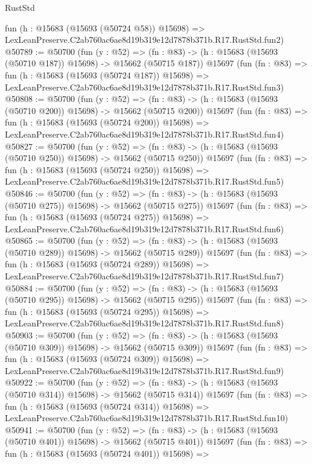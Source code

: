 \begin{lexlean}{RustStd}
\begin{coremodule}
    fun (h : @15683 (@15693 (@50724 @58)) @15698) =>
    LexLeanPreserve.C2ab760ac6ae8d19b319e12d7878b371b.R17.RustStd.fun2)
@50789 := @50700
    (fun (y : @52) =>
    (fn : @83) -> (h : @15683 (@15693 (@50710 @187)) @15698) -> @15662 (@50715 @187))
    @15697
    (fun (fn : @83) =>
    fun (h : @15683 (@15693 (@50724 @187)) @15698) =>
    LexLeanPreserve.C2ab760ac6ae8d19b319e12d7878b371b.R17.RustStd.fun3)
@50808 := @50700
    (fun (y : @52) =>
    (fn : @83) -> (h : @15683 (@15693 (@50710 @200)) @15698) -> @15662 (@50715 @200))
    @15697
    (fun (fn : @83) =>
    fun (h : @15683 (@15693 (@50724 @200)) @15698) =>
    LexLeanPreserve.C2ab760ac6ae8d19b319e12d7878b371b.R17.RustStd.fun4)
@50827 := @50700
    (fun (y : @52) =>
    (fn : @83) -> (h : @15683 (@15693 (@50710 @250)) @15698) -> @15662 (@50715 @250))
    @15697
    (fun (fn : @83) =>
    fun (h : @15683 (@15693 (@50724 @250)) @15698) =>
    LexLeanPreserve.C2ab760ac6ae8d19b319e12d7878b371b.R17.RustStd.fun5)
@50846 := @50700
    (fun (y : @52) =>
    (fn : @83) -> (h : @15683 (@15693 (@50710 @275)) @15698) -> @15662 (@50715 @275))
    @15697
    (fun (fn : @83) =>
    fun (h : @15683 (@15693 (@50724 @275)) @15698) =>
    LexLeanPreserve.C2ab760ac6ae8d19b319e12d7878b371b.R17.RustStd.fun6)
@50865 := @50700
    (fun (y : @52) =>
    (fn : @83) -> (h : @15683 (@15693 (@50710 @289)) @15698) -> @15662 (@50715 @289))
    @15697
    (fun (fn : @83) =>
    fun (h : @15683 (@15693 (@50724 @289)) @15698) =>
    LexLeanPreserve.C2ab760ac6ae8d19b319e12d7878b371b.R17.RustStd.fun7)
@50884 := @50700
    (fun (y : @52) =>
    (fn : @83) -> (h : @15683 (@15693 (@50710 @295)) @15698) -> @15662 (@50715 @295))
    @15697
    (fun (fn : @83) =>
    fun (h : @15683 (@15693 (@50724 @295)) @15698) =>
    LexLeanPreserve.C2ab760ac6ae8d19b319e12d7878b371b.R17.RustStd.fun8)
@50903 := @50700
    (fun (y : @52) =>
    (fn : @83) -> (h : @15683 (@15693 (@50710 @309)) @15698) -> @15662 (@50715 @309))
    @15697
    (fun (fn : @83) =>
    fun (h : @15683 (@15693 (@50724 @309)) @15698) =>
    LexLeanPreserve.C2ab760ac6ae8d19b319e12d7878b371b.R17.RustStd.fun9)
@50922 := @50700
    (fun (y : @52) =>
    (fn : @83) -> (h : @15683 (@15693 (@50710 @314)) @15698) -> @15662 (@50715 @314))
    @15697
    (fun (fn : @83) =>
    fun (h : @15683 (@15693 (@50724 @314)) @15698) =>
    LexLeanPreserve.C2ab760ac6ae8d19b319e12d7878b371b.R17.RustStd.fun10)
@50941 := @50700
    (fun (y : @52) =>
    (fn : @83) -> (h : @15683 (@15693 (@50710 @401)) @15698) -> @15662 (@50715 @401))
    @15697
    (fun (fn : @83) =>
    fun (h : @15683 (@15693 (@50724 @401)) @15698) =>

\end{coremodule}
\end{lexlean}
